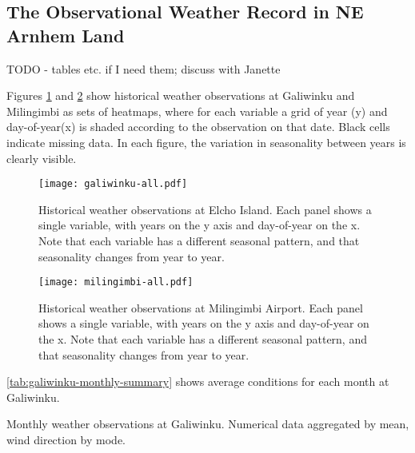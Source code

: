 \subsection{The Observational Weather Record in NE Arnhem Land}
TODO - tables etc. if I need them; discuss with Janette

Figures \ref{fig:galiwinku-observations} and \ref{fig:milingimbi-observations}
show historical weather observations at Galiwinku and Milingimbi as
sets of heatmaps, where for each variable a grid of year (y) and day-of-year(x)
is shaded according to the observation on that date.
Black cells indicate missing data.
In each figure, the variation in seasonality between years is clearly visible.


\begin{figure}[p]
    \centering
    \texttt{[image: galiwinku-all.pdf]}
    \caption[Historical weather observations at Elcho Island]{
        Historical weather observations at Elcho Island.
        Each panel shows a single variable, with years on the y axis and day-of-year on the x.
        Note that each variable has a different seasonal pattern,
        and that seasonality changes from year to year.}
    \label{fig:galiwinku-observations}
\end{figure}
\begin{figure}[p]
    \centering
    \texttt{[image: milingimbi-all.pdf]}
    \caption[Historical weather observations at Milingimbi Airport]{
        Historical weather observations at Milingimbi Airport.
        Each panel shows a single variable, with years on the y axis and day-of-year on the x.
        Note that each variable has a different seasonal pattern,
        and that seasonality changes from year to year.}
    \label{fig:milingimbi-observations}
\end{figure}


\autoref{tab:galiwinku-monthly-summary} shows average conditions for each
month at Galiwinku.

\begin{landscape}
\begin{table}
    
    \caption{Monthly weather observations at Galiwinku.
        Numerical data aggregated by mean, wind direction by mode.}
    \label{tab:galiwinku-monthly-summary}
\end{table}
\end{landscape}



